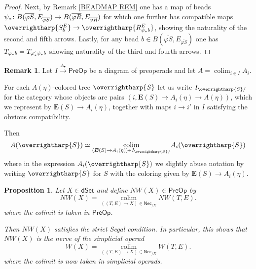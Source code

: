 \documentclass[a4paper,10pt
,draft
]{article}%
\numberwithin{equation}{section}
\numberwithin{figure}{section}
\newtheorem{proposition}[equation]{Proposition}%
\theoremstyle{definition} %
\newtheorem{remark}[equation]{Remark}%
\newcommand{\vect}[1]{\text{\overrightharp{\ensuremath{#1}}}}
\DeclareMathOperator{\colim}{colim}%
\newcommand{\1}{\ensuremath{\mathbbm 1}}%
\begin{document}
\begin{proof}
Next, by Remark \ref{BEADMAP REM}
one has a map of beads
$\psi_{\**} \colon 
B(\overline{\varphi S},E_{\overline{\varphi S}})
\to
B(\overline{\varphi R},E_{\overline{\varphi R}})$
for which one further has compatible maps
$\vect{S^{E}_b}
\to 
\vect{R^{E}_{\psi_{\**}b}}$,
showing the naturality of the second and fifth arrows.
Lastly, for any bead 
$b \in B(\overline{\varphi S},E_{\overline{\varphi S}})$
one has
$T_{\varphi_{\**}b} = T_{\varphi'_{\**} \psi_{\**}b}$
showing naturality of the third and fourth arrows.
\end{proof}




\begin{remark}\label{PREOPCOLEV REM}
	Let $I \xrightarrow{A_{\bullet}} \mathsf{PreOp}$
	be a diagram of preoperads and let
	$A = \colim_{i \in I} A_i$.
	
	For each $A(\eta)$-colored tree $\vect{S}$
	let us write
	$I_{\vect{S}/}$
	for the category whose objects are pairs
	$(i,\boldsymbol{E}(S) \to A_i(\eta) \to A(\eta))$,
	which we represent by 
	$\boldsymbol{E}(S) \to A_i(\eta)$,
	together with maps $i \to i'$ in $I$
	satisfying the obvious compatibility.
	
	Then
\[
	A(\vect{S}) \simeq 
	\underset{(\boldsymbol{E}(S) \to A_i(\eta)) \in I_{\vect{S}/}}{\colim}
	A_i(\vect{S})
\]
where in the expression $A_i(\vect{S})$
we slightly abuse notation by writing $\vect{S}$
for $S$ with the coloring given by
$\boldsymbol{E}(S) \to A_i(\eta)$.
\end{remark}





\begin{proposition}
      \label{NWKANEX_PROP}
	Let $X \in \mathsf{dSet}$ and define
	$NW(X) \in \mathsf{PreOp}$ by
\begin{equation}\label{NWKANEX EQ}
	NW(X) =
	\underset{((T,E) \to X)
	\in \mathsf{Nec}_{/X}}{\colim}
	NW(T,E).
\end{equation}
	where the colimit is taken in $\mathsf{PreOp}$.
	
	Then $NW(X)$ satisfies the strict Segal condition.
%
	In particular, this shows that 	
	$NW(X)$ is the nerve of the simplicial operad
\[
W(X) =
\underset{((T,E) \to X)
	\in \mathsf{Nec}_{/X}}{\colim}
W(T,E).
\]
where the colimit is now taken in simplicial operads.
\end{proposition}
\end{document}
